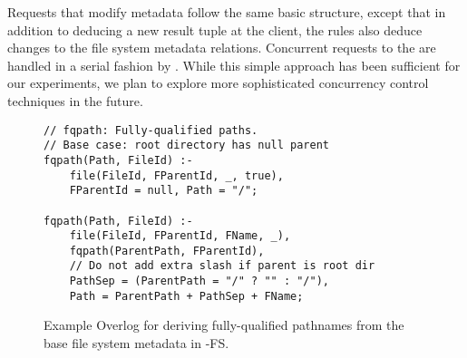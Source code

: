 Requests that modify metadata follow the same basic structure, except that in
addition to deducing a new result tuple at the client, the {\NN} rules also
deduce changes to the file system metadata relations. Concurrent requests to the
{\NN} are handled in a serial fashion by {\JOL}. While this simple approach has
been sufficient for our experiments, we plan to explore more sophisticated
concurrency control techniques in the future.

\begin{figure}[t]
\centering
\begin{footnotesize}
\begin{verbatim}
// fqpath: Fully-qualified paths.
// Base case: root directory has null parent
fqpath(Path, FileId) :-
    file(FileId, FParentId, _, true),
    FParentId = null, Path = "/";

fqpath(Path, FileId) :-
    file(FileId, FParentId, FName, _),
    fqpath(ParentPath, FParentId),
    // Do not add extra slash if parent is root dir
    PathSep = (ParentPath = "/" ? "" : "/"),
    Path = ParentPath + PathSep + FName;
\end{verbatim}
\end{footnotesize}
\vspace{-8pt}
\caption{Example Overlog for deriving fully-qualified pathnames from
  the base file system metadata in \BOOM-FS.}
\label{fig:bfs-path}
\vspace{-8pt}
\end{figure}





